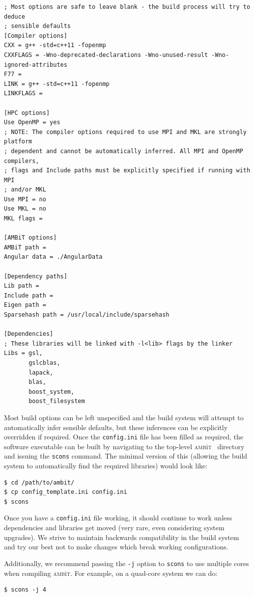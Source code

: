 \documentclass{report}
\newcommand{\ambit}{\textsc{amb}{\footnotesize i}\textsc{t}}
\begin{document}
\begin{verbatim}
; Most options are safe to leave blank - the build process will try to deduce
; sensible defaults
[Compiler options]
CXX = g++ -std=c++11 -fopenmp
CXXFLAGS = -Wno-deprecated-declarations -Wno-unused-result -Wno-ignored-attributes 
F77 = 
LINK = g++ -std=c++11 -fopenmp
LINKFLAGS = 

[HPC options]
Use OpenMP = yes
; NOTE: The compiler options required to use MPI and MKL are strongly platform 
; dependent and cannot be automatically inferred. All MPI and OpenMP compilers, 
; flags and Include paths must be explicitly specified if running with MPI 
; and/or MKL
Use MPI = no
Use MKL = no
MKL flags = 

[AMBiT options]
AMBiT path = 
Angular data = ./AngularData

[Dependency paths]
Lib path =
Include path =
Eigen path =
Sparsehash path = /usr/local/include/sparsehash

[Dependencies]
; These libraries will be linked with -l<lib> flags by the linker
Libs = gsl,
       gslcblas,
       lapack, 
       blas, 
       boost_system, 
       boost_filesystem
\end{verbatim}

Most build options can be left unspecified and the build system will attempt to automatically
infer sensible defaults, but these inferences can be explicitly overridden if required. Once the 
\texttt{config.ini} file has been filled as required, the software executable can be built by 
navigating to the top-level \ambit~ directory and issuing the \texttt{scons} command. The minimal
version of this (allowing the build system to automatically find the required libraries) would look
like:

\begin{verbatim}
$ cd /path/to/ambit/
$ cp config_template.ini config.ini
$ scons
\end{verbatim}

Once you have a \texttt{config.ini} file working, it should continue to work unless dependencies and
libraries get moved (very rare, even considering system upgrades). We strive to maintain backwards
compatibility in the build system and try our best not to make changes which break working 
configurations. 

Additionally, we recommend passing the \texttt{-j} option to \texttt{scons} to use multiple cores when
compiling \ambit. For example, on a quad-core system we can do:

\begin{verbatim}
$ scons -j 4
\end{verbatim}
\end{document}
